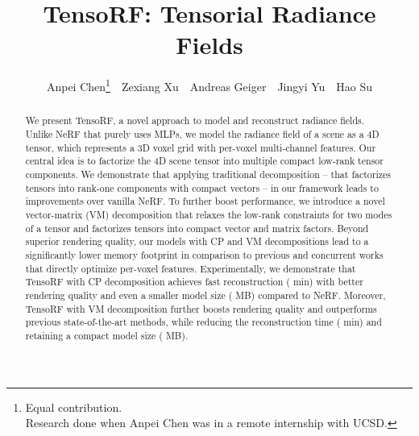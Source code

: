 \documentclass[runningheads]{llncs}
\makeatletter
\newcommand{\printfnsymbol}[1]{\textsuperscript{\@fnsymbol{#1}}}
\makeatother
\begin{document}
\pagestyle{headings}
\mainmatter

\title{TensoRF: Tensorial Radiance Fields} 





\author{Anpei Chen\thanks{Equal contribution.\\ Research done when Anpei Chen was in a remote internship with UCSD.}
\,\,
Zexiang Xu\printfnsymbol{1}
\,\,
Andreas Geiger 
\,\,
Jingyi Yu
\,\,
Hao Su 
}




\maketitle

\begin{abstract}
We present TensoRF, a novel approach to model and reconstruct radiance fields.
Unlike NeRF that purely uses MLPs, we model the radiance field of a scene as a 4D tensor, which represents a 3D voxel grid with per-voxel multi-channel features.
Our central idea is to factorize the 4D scene tensor into multiple compact low-rank tensor components. 
We demonstrate that applying traditional  decomposition -- that factorizes tensors into rank-one components with compact vectors -- in our framework leads to improvements over vanilla NeRF. 
To further boost performance, we introduce a novel vector-matrix (VM) decomposition that relaxes the low-rank constraints for two modes of a tensor and factorizes tensors into compact vector and matrix factors. 
Beyond superior rendering quality, our models with CP and VM decompositions lead to a significantly lower memory footprint in comparison to previous and concurrent works that directly optimize per-voxel features.
Experimentally, we demonstrate that TensoRF with CP decomposition achieves fast reconstruction ( min) with better rendering quality and even a smaller model size ( MB) compared to NeRF.
Moreover, TensoRF with VM decomposition further boosts rendering quality and outperforms previous state-of-the-art methods, while reducing the reconstruction time ( min) and retaining a compact model size ( MB).



%
 \end{abstract}
\end{document}
